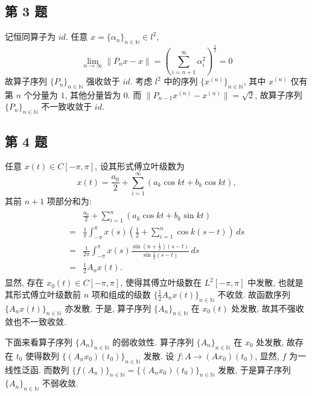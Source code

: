 \documentclass[\ROOT/main.tex]{subfiles}
\begin{document}
\subsection{第 3 题}
记恒同算子为 $id$.
任意 $x = \{ \alpha_{n} \}_{n \in \mathbb{N}} \in l^2$,
\[
    \lim_{n \to \infty} \| P_n x - x \|
    = \left( \sum_{i = n + 1}^{\infty} \alpha_i^2 \right)^{\frac{1}{2}}
    = 0
\]
故算子序列 $\{ P_{n} \}_{n \in \mathbb{N}}$ 强收敛于 $id$.
考虑 $l^2$ 中的序列 $\{ x^{(n)} \}_{n \in \mathbb{N}}$,
其中 $x^{(n)}$ 仅有第 $n$ 个分量为 $1$, 其他分量皆为 $0$.
而 $\| P_{n - 1} x^{(n)} - x^{(n)} \| = \sqrt{2}$,
故算子序列 $\{ P_{n} \}_{n \in \mathbb{N}}$ 不一致收敛于 $id$.

\subsection{第 4 题}
任意 $x(t) \in C[-\pi, \pi]$, 设其形式傅立叶级数为
\[
    x(t) = \frac{a_0}{2} + \sum_{i = 1}^{\infty}(a_k \cos{kt} + b_k \cos{kt}),
\]
其前 $n + 1$ 项部分和为:
\begin{align}
    \begin{split} \label{eq:1}
         & \frac{a_0}{2} + \sum_{i = 1}^{n}(a_k \cos kt + b_k \sin kt) \\
        =& \frac{1}{\pi} \int_{-\pi}^{\pi} x(s)(\frac{1}{2} + \sum_{i = 1}^{n} \cos k(s - t)) \, ds \\
        =& \frac{1}{2 \pi} \int_{-\pi}^{\pi} x(s) \frac{\sin (n + \frac{1}{2})(s - t)}{\sin \frac{1}{2}(s - t)} \, ds \\
        =& \frac{1}{2} A_n x(t).
    \end{split}
\end{align}
显然, 存在 $x_0(t) \in C[-\pi, \pi]$,
使得其傅立叶级数在 $L^2 [-\pi, \pi]$ 中发散,
也就是其形式傅立叶级数前 $n$ 项和组成的级数 $\{ \frac{1}{2} A_n x(t) \}_{n \in \mathbb{N}}$ 不收敛.
故函数序列 $\{ A_n x(t) \}_{n \in \mathbb{N}}$ 亦发散.
于是, 算子序列 $\{ A_n \}_{n \in \mathbb{N}}$ 在 $x_0(t)$ 处发散,
故其不强收敛也不一致收敛.

下面来看算子序列 $\{ A_n \}_{n \in \mathbb{N}}$ 的弱收敛性.
算子序列 $\{ A_n \}_{n \in \mathbb{N}}$ 在 $x_0$ 处发散,
故存在 $t_0$ 使得数列 $\{ (A_n x_0)(t_0) \}_{n \in \mathbb{N}}$ 发散.
设 $f: A \to (A x_0)(t_0)$, 显然, $f$ 为一线性泛函.
而数列 $\{ f(A_n) \}_{n \in \mathbb{N}} = \{ (A_n x_0)(t_0) \}_{n \in \mathbb{N}}$ 发散,
于是算子序列 $\{ A_n \}_{n \in \mathbb{N}}$ 不弱收敛.
\end{document}
